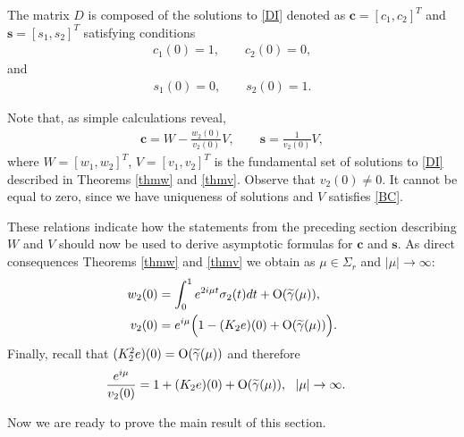 \documentclass[11pt]{amsart}
\theoremstyle{plain}
\theoremstyle{definition}
\theoremstyle{remark}
\numberwithin{equation}{section}
\begin{document}
The matrix $D$ is composed of the solutions to \eqref{DI} denoted as
$\mathbf{c}=[c_1,c_2]^T$ and $\mathbf{s}=[s_1,s_2]^T$
satisfying conditions
\begin{align}\label{cwarunki}
c_1(0)=1, \qquad c_2(0)=0,
\end{align}
and
\begin{align}\label{swarunki}
s_1(0)=0, \qquad s_2(0)=1.
\end{align}

Note that, as simple calculations reveal,
\begin{align}\label{reprCS}
\mathbf{c}=W-\frac{w_2(0)}{v_2(0)}V,\qquad
\mathbf{s}=\frac{1}{v_2(0)}V,%
\end{align}
where $W=[w_1,w_2]^T$, $V=[v_1,v_2]^T$ is the fundamental set of solutions to \eqref{DI} described in Theorems \ref{thmw} and \ref{thmv}.
Observe that $v_2(0)\neq 0$. It cannot be equal to zero, since
we have uniqueness of solutions and $V$ satisfies \eqref{BC}.

These relations indicate how the statements  from the preceding section describing $W$ and $V$  should now be used to derive asymptotic formulas for
$\mathbf{c}$ and $\mathbf{s}$. As direct consequences Theorems \ref{thmw} and \ref{thmv} we obtain as $\mu \in \Sigma_r$ and $|\mu| \to \infty:$
\begin{align}
w_2(0)&=\int_0^1 e^{2i \mu t }\sigma_2(t)dt+{\rm O}(\widetilde{\gamma}(\mu)),\label{w20}\\
v_2(0)&= e^{i \mu }\Big(1-(K_2e)(0)+{\rm O}(\widetilde{\gamma}(\mu))\Big). \label{v20}
\end{align}
Finally, recall that $(K^2_2e)(0)={\rm O}(\widetilde{\gamma}(\mu))$ and therefore
\begin{align}\label{przezv20}
\frac{e^{i \mu }}{v_2(0)}&= 1+(K_2e)(0)+{\rm O}(\widetilde{\gamma}(\mu)), \ \ |\mu|\to \infty.
\end{align}

Now we are ready to prove the main result of this section.
\end{document}
